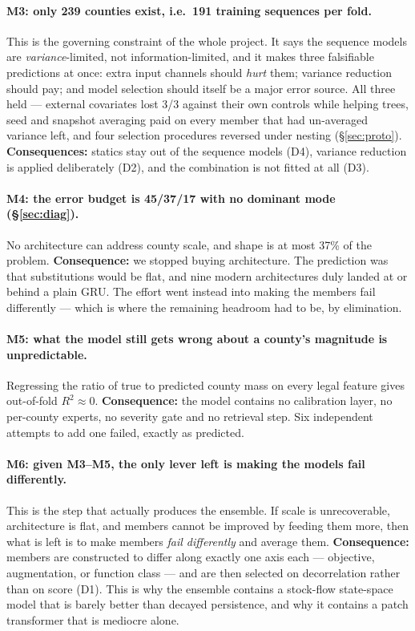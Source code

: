\documentclass[10pt,letterpaper,twocolumn]{article}
\begin{document}
\paragraph{M3: only 239 counties exist, i.e.\ 191 training sequences per fold.}
This is the governing constraint of the whole project. It says the sequence
models are \emph{variance}-limited, not information-limited, and it makes three
falsifiable predictions at once: extra input channels should \emph{hurt} them;
variance reduction should pay; and model selection should itself be a major
error source. All three held --- external covariates lost 3/3 against their own
controls while helping trees, seed and snapshot averaging paid on every member
that had un-averaged variance left, and four selection procedures reversed under
nesting (§\ref{sec:proto}). \textbf{Consequences:} statics stay out of the
sequence models (D4), variance reduction is applied deliberately (D2), and the
combination is not fitted at all (D3).

\paragraph{M4: the error budget is 45/37/17 with no dominant mode
(§\ref{sec:diag}).} No architecture can address county scale, and shape is at
most 37\% of the problem. \textbf{Consequence:} we stopped buying architecture.
The prediction was that substitutions would be flat, and nine modern architectures duly landed at or behind a plain GRU. The effort went instead into making the members fail differently --- which is where the remaining headroom had to be,
by elimination.

\paragraph{M5: what the model still gets wrong about a county's magnitude is
unpredictable.} Regressing the ratio of true to predicted county mass on every
legal feature gives out-of-fold $R^2 \approx 0$. \textbf{Consequence:} the model contains no calibration
layer, no per-county experts, no severity gate and no retrieval step. Six
independent attempts to add one failed, exactly as predicted.

\paragraph{M6: given M3--M5, the only lever left is making the models fail
differently.}
This is the step that actually produces the ensemble. If scale is unrecoverable,
architecture is flat, and members cannot be improved by feeding them more, then
what is left is to make members \emph{fail differently} and average them.
\textbf{Consequence:} members are constructed to differ along exactly one axis
each --- objective, augmentation, or function class --- and are then selected on
decorrelation rather than on score (D1). This is why the ensemble contains a
stock-flow state-space model that is barely better than decayed persistence, and
why it contains a patch transformer that is mediocre alone.
\end{document}
